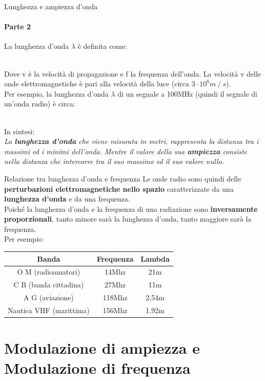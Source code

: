 \documentclass[aspectratio=169]{beamer}
\newcommand*{\vet}{\fontfamily{qzc}\selectfont}
\begin{document}
\begin{frame}{Lunghezza e ampiezza d'onda}
	\framesubtitle{Parte 2}
	La lunghezza d'onda $\lambda$ è definita come:\\
	\medskip
	\centering{$\lambda = \frac{{\vet v}}{{\vet f}}$}\\
	\smallskip
	\raggedright{Dove {\vet v} è la velocità di propagazione e {\vet f} la frequenza dell'onda. La velocità {\vet v} delle onde elettromagnetiche è pari alla velocità della luce (circa $3 \cdot 10^8 m\mathbin{/}s$)}.\\
	\medskip
	Per esempio, la lunghezza d'onda $\lambda$ di un segnale a 100MHz (quindi il segnale di un'onda radio) è circa:\\
	\medskip
	\\
	\medskip
	\raggedright{In sintesi:}\\
	\emph{La \textbf{lunghezza d'onda} che viene misurata in metri, rappresenta la distanza tra i massimi ed i minimi dell'onda. Mentre il valore della sua \textbf{ampiezza} consiste nella distanza che intercorre tra il suo massimo ed il suo valore nullo.}
\end{frame}

\begin{frame}{Relazione tra lunghezza d'onda e frequenza}
	Le onde radio sono quindi delle \textbf{perturbazioni elettromagnetiche nello spazio} caratterizzate da una \textbf{lunghezza d'onda} e da una frequenza.\\
	Poiché la lunghezza d'onda e la frequenza di una radiazione sono \textbf{inversamente proporzionali}, tanto minore sarà la lunghezza d'onda, tanto maggiore sarà la frequenza.\\
	\medskip
	Per esempio:\\
	\centering
	\begin{tabular}{|c|c|c|}
		\hline
		\textbf{Banda}& \textbf{Frequenza} & \textbf{Lambda} \\
		\hline
		O M (radioamatori)& 14Mhz & 21m \\
		\hline
		C B (banda cittadina)& 27Mhz & 11m\\
		\hline
		A G (aviazione)& 118Mhz & 2,54m \\
		\hline
		Nautica VHF (marittima)& 156Mhz & 1.92m \\
		\hline
	\end{tabular}
\end{frame}

\section{Modulazione di ampiezza e Modulazione di frequenza}
\begin{frame}
	\\
\end{frame}
\end{document}
